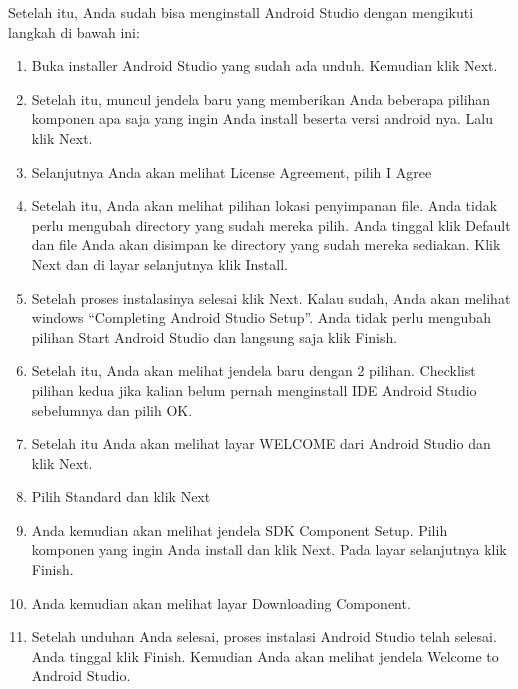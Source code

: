 Setelah itu, Anda sudah bisa menginstall Android Studio dengan mengikuti langkah di bawah ini:
\begin{enumerate}
\item Buka installer Android Studio yang sudah ada unduh. Kemudian klik Next.
\item Setelah itu, muncul jendela baru yang memberikan Anda beberapa pilihan komponen apa saja yang ingin Anda install beserta versi android nya. Lalu klik Next.
\item Selanjutnya Anda akan melihat License Agreement, pilih I Agree
\item Setelah itu, Anda akan melihat pilihan lokasi penyimpanan file. Anda tidak perlu mengubah directory yang sudah mereka pilih. Anda tinggal klik Default dan file Anda akan disimpan ke directory yang sudah mereka sediakan. Klik Next dan di layar selanjutnya klik Install.
\item Setelah proses instalasinya selesai klik Next. Kalau sudah, Anda akan melihat windows “Completing Android Studio Setup”. Anda tidak perlu mengubah pilihan Start Android Studio dan langsung saja klik Finish.
\item Setelah itu, Anda akan melihat jendela baru dengan 2 pilihan. Checklist pilihan kedua jika kalian belum pernah menginstall IDE Android Studio sebelumnya dan pilih OK.
\item Setelah itu Anda akan melihat layar WELCOME dari Android Studio dan klik Next.
\item Pilih Standard dan klik Next
\item Anda kemudian akan melihat jendela SDK Component Setup. Pilih komponen yang ingin Anda install dan klik Next. Pada layar selanjutnya klik Finish.
\item Anda kemudian akan melihat layar Downloading Component.
\item Setelah unduhan Anda selesai, proses instalasi Android Studio telah selesai. Anda tinggal klik Finish. Kemudian Anda akan melihat jendela Welcome to Android Studio.
\end{enumerate}